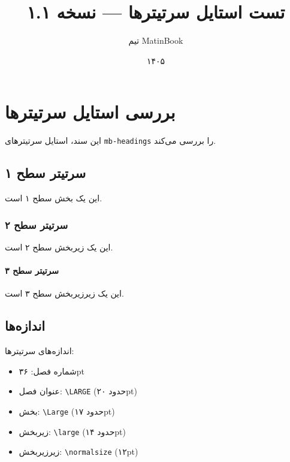 \documentclass{matinbook}
\title{تست استایل سرتیترها — نسخه ۱.۱}
\author{تیم MatinBook}
\date{۱۴۰۵}
\begin{document}
\maketitle

\tableofcontents
\listoffigures
\listoftables

\chapter{بررسی استایل سرتیترها}
\label{chap:test-headings}

این سند، استایل سرتیترهای \texttt{mb-headings} را بررسی می‌کند.

\section{سرتیتر سطح ۱}
\label{sec:level-1}

این یک بخش سطح ۱ است.

\subsection{سرتیتر سطح ۲}
\label{sec:level-2}

این یک زیربخش سطح ۲ است.

\subsubsection{سرتیتر سطح ۳}
\label{sec:level-3}

این یک زیرزیربخش سطح ۳ است.

\section{اندازه‌ها}
\label{sec:sizes}

اندازه‌های سرتیترها:

\begin{itemize}
    \item شماره فصل: ۳۶pt
    \item عنوان فصل: \verb|\LARGE| (حدود ۲۰pt)
    \item بخش: \verb|\Large| (حدود ۱۷pt)
    \item زیربخش: \verb|\large| (حدود ۱۴pt)
    \item زیرزیربخش: \verb|\normalsize| (۱۲pt)
\end{itemize}

\end{document}
